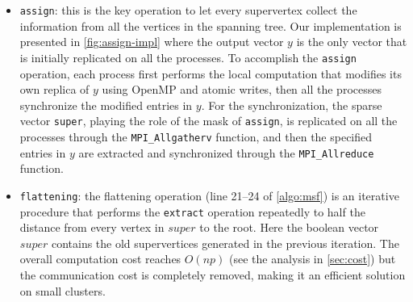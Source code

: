 \documentclass{sokendai_thesis} %
\newcommand{\boruvka}[0]{Boruvka}
\begin{document}
\begin{itemize}

\item \texttt{assign}: this is the key operation to let every supervertex collect the information from all the vertices in the spanning tree.
Our implementation is presented in \autoref{fig:assign-impl} where the output vector $\mathit{y}$ is the only vector that is initially replicated on all the processes.
To accomplish the \texttt{assign} operation, each process first performs the local computation that modifies its own replica of $\mathit{y}$ using OpenMP and atomic writes, then all the processes synchronize the modified entries in $\mathit{y}$.
For the synchronization, the sparse vector \texttt{super}, playing the role of the mask of \texttt{assign}, is replicated on all the processes through the \texttt{MPI\_Allgatherv} function, and then the specified entries in $\mathit{y}$ are extracted and synchronized through the \texttt{MPI\_Allreduce} function.


\item \texttt{flattening}: the flattening operation (line 21--24 of \autoref{algo:msf}) is an iterative procedure that performs the \texttt{extract} operation repeatedly to half the distance from every vertex in $\mathit{super}$ to the root.
Here the boolean vector $\mathit{super}$ contains the old supervertices generated in the previous iteration.
The overall computation cost reaches $O(np)$ (see the analysis in \autoref{sec:cost}) but the communication cost is completely removed, making it an efficient solution on small clusters.


\end{itemize}
\end{document}
